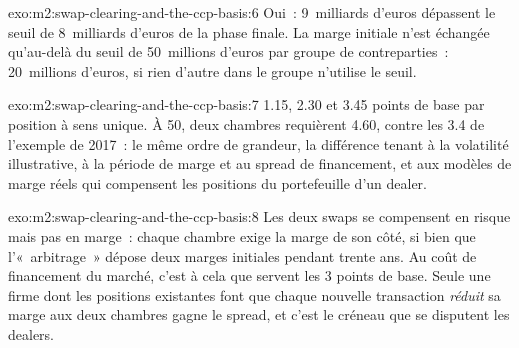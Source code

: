 \begin{solution}{exo:m2:swap-clearing-and-the-ccp-basis:6}
Oui~: 9~milliards d'euros dépassent le seuil de 8~milliards d'euros de la phase finale.
La marge initiale n'est échangée qu'au-delà du seuil de 50~millions d'euros par
groupe de contreparties~: 20~millions d'euros, si rien d'autre dans le groupe n'utilise le
seuil.
\end{solution}

\begin{solution}{exo:m2:swap-clearing-and-the-ccp-basis:7}
1.15, 2.30 et 3.45 points de base par position à sens unique. À 50, deux chambres
requièrent 4.60, contre les 3.4 de l'exemple de 2017~: le même ordre de grandeur, la
différence tenant à la volatilité illustrative, à la période de marge et au
spread de financement, et aux modèles de marge réels qui compensent les positions du portefeuille d'un dealer.
\end{solution}

\begin{solution}{exo:m2:swap-clearing-and-the-ccp-basis:8}
Les deux swaps se compensent en risque mais pas en marge~: chaque chambre exige la marge
de son côté, si bien que l'«~arbitrage~» dépose deux marges initiales pendant trente ans. Au
coût de financement du marché, c'est à cela que servent les 3 points de base. Seule une firme
dont les positions existantes font que chaque nouvelle transaction \emph{réduit} sa marge aux deux
chambres gagne le spread, et c'est le créneau que se disputent les dealers.
\end{solution}

